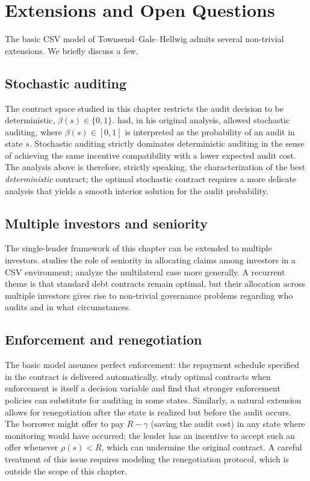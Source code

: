 \documentclass[11pt,a4paper,oneside]{book}
\theoremstyle{plain}
\theoremstyle{definition}
\theoremstyle{remark}
\numberwithin{equation}{chapter}
\begin{document}
\section{Extensions and Open Questions}
\label{sec:GH-extensions}

The basic CSV model of Townsend--Gale--Hellwig admits several non-trivial extensions.
We briefly discuss a few.

\subsection{Stochastic auditing}

The contract space studied in this chapter restricts the audit decision to be deterministic, $\beta(s) \in \{0, 1\}$.
\citet{Townsend1979} had, in his original analysis, allowed stochastic auditing, where $\beta(s) \in [0, 1]$ is interpreted as the probability of an audit in state $s$.
Stochastic auditing strictly dominates deterministic auditing in the sense of achieving the same incentive compatibility with a lower expected audit cost.
The analysis above is therefore, strictly speaking, the characterization of the best \emph{deterministic} contract; the optimal stochastic contract requires a more delicate analysis that yields a smooth interior solution for the audit probability.

\subsection{Multiple investors and seniority}

The single-lender framework of this chapter can be extended to multiple investors.
\citet{Winton1995} studies the role of seniority in allocating claims among investors in a CSV environment; \citet{KrasaVillamil1994} analyze the multilateral case more generally.
A recurrent theme is that standard debt contracts remain optimal, but their allocation across multiple investors gives rise to non-trivial governance problems regarding who audits and in what circumstances.

\subsection{Enforcement and renegotiation}

The basic model assumes perfect enforcement: the repayment schedule specified in the contract is delivered automatically.
\citet{KrasaVillamil2000} study optimal contracts when enforcement is itself a decision variable and find that stronger enforcement policies can substitute for auditing in some states.
Similarly, a natural extension allows for renegotiation after the state is realized but before the audit occurs.
The borrower might offer to pay $R - \gamma$ (saving the audit cost) in any state where monitoring would have occurred; the lender has an incentive to accept such an offer whenever $\rho(s) < R$, which can undermine the original contract.
A careful treatment of this issue requires modeling the renegotiation protocol, which is outside the scope of this chapter.
\end{document}
